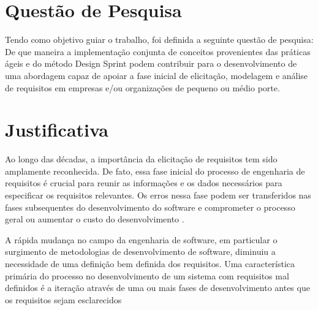 \section{Questão de Pesquisa}
Tendo como objetivo guiar o trabalho, foi definida a seguinte questão de pesquisa:
De que maneira a implementação conjunta de conceitos provenientes das práticas ágeis e do método Design Sprint podem contribuir para o desenvolvimento de uma abordagem capaz de apoiar a fase inicial de elicitação, modelagem e análise de requisitos em empresas e/ou organizações de pequeno ou médio porte.

\section{Justificativa}

Ao longo das décadas, a importância da elicitação de requisitos tem sido amplamente reconhecida. De fato, essa fase inicial do processo de engenharia de requisitos é crucial para reunir as informações e os dados necessários para especificar os requisitos relevantes. Os erros nessa fase podem ser transferidos nas fases subsequentes do desenvolvimento do software e comprometer o processo geral ou aumentar o custo do desenvolvimento \cite{spoletini2017requirements}.

A rápida mudança no campo da engenharia de software, em particular o surgimento de metodologias de desenvolvimento de software, diminuiu a necessidade de uma definição bem definida dos requisitos. Uma característica primária do processo no desenvolvimento de um sistema com requisitos mal definidos é a iteração através de uma ou mais fases de desenvolvimento antes que os requisitos sejam esclarecidos \cite{requirementsanalysis}

